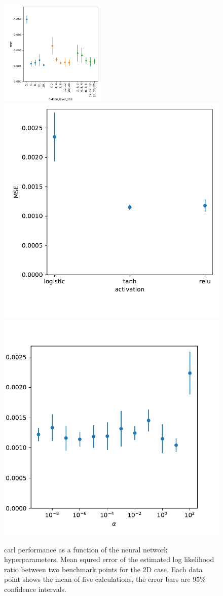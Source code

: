 \begin{figure}
  \includegraphics[width=0.45\textwidth]{figures/appendix/pointwise_tuning_2d/mse_mlp_hidden_layer_sizes.pdf}%
  \includegraphics[height=0.45\textwidth]{figures/appendix/pointwise_tuning_2d/mse_mlp_activation.pdf}\\%
  \includegraphics[height=0.45\textwidth]{figures/appendix/pointwise_tuning_2d/mse_mlp_alpha.pdf}%
  \caption{carl performance as a function of the neural network
    hyperparameters. Mean squred error of the estimated log likelihood
    ratio between two benchmark points for the 2D case. Each data
    point shows the mean of five calculations, the error bars are
    $95\%$ confidence intervals.}
  \label{fig:pointwise_tuning_2d_mlp_tuning}
\end{figure}


